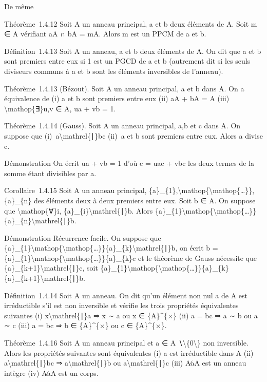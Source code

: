\documentclass[]{article}
\begin{document}
De même

Théorème~1.4.12 Soit A un anneau principal, a et b deux éléments de A.
Soit m ∈ A vérifiant aA ∩ bA = mA. Alors m est un PPCM de a et b.

Définition~1.4.13 Soit A un anneau, a et b deux éléments de A. On dit
que a et b sont premiers entre eux si 1 est un PGCD de a et b (autrement
dit si les seuls diviseurs communs à a et b sont les éléments
inversibles de l'anneau).

Théorème~1.4.13 (Bézout). Soit A un anneau principal, a et b dans A. On
a équivalence de (i) a et b sont premiers entre eux (ii) aA + bA = A
(iii) \textbackslash{}mathop\{∃\}u,v ∈ A, ua + vb = 1.

Théorème~1.4.14 (Gauss). Soit A un anneau principal, a,b et c dans A. On
suppose que (i)~a\textbackslash{}mathrel\{∣\}bc (ii)~a et b sont
premiers entre eux. Alors a divise c.

Démonstration On écrit ua + vb = 1 d'où c = uac + vbc les deux termes de
la somme étant divisibles par a.

Corollaire~1.4.15 Soit A un anneau principal,
\{a\}\_\{1\},\textbackslash{}mathop\{\textbackslash{}mathop\{\ldots{}\}\},\{a\}\_\{n\}
des éléments deux à deux premiers entre eux. Soit b ∈ A. On suppose que
\textbackslash{}mathop\{∀\}i, \{a\}\_\{i\}\textbackslash{}mathrel\{∣\}b.
Alors
\{a\}\_\{1\}\textbackslash{}mathop\{\textbackslash{}mathop\{\ldots{}\}\}\{a\}\_\{n\}\textbackslash{}mathrel\{∣\}b.

Démonstration Récurrence facile. On suppose que
\{a\}\_\{1\}\textbackslash{}mathop\{\textbackslash{}mathop\{\ldots{}\}\}\{a\}\_\{k\}\textbackslash{}mathrel\{∣\}b,
on écrit b =
\{a\}\_\{1\}\textbackslash{}mathop\{\textbackslash{}mathop\{\ldots{}\}\}\{a\}\_\{k\}c
et le théorème de Gauss nécessite que
\{a\}\_\{k+1\}\textbackslash{}mathrel\{∣\}c, soit
\{a\}\_\{1\}\textbackslash{}mathop\{\textbackslash{}mathop\{\ldots{}\}\}\{a\}\_\{k\}\{a\}\_\{k+1\}\textbackslash{}mathrel\{∣\}b.

Définition~1.4.14 Soit A un anneau. On dit qu'un élément non nul a de A
est irréductible s'il est non inversible et vérifie les trois propriétés
équivalentes suivantes (i) x\textbackslash{}mathrel\{∣\}a ⇒ x ∼ a ou x ∈
\{A\}\^{}\{×\} (ii) a = bc ⇒ a ∼ b ou a ∼ c (iii) a = bc ⇒ b ∈
\{A\}\^{}\{×\} ou c ∈ \{A\}\^{}\{×\}.

Théorème~1.4.16 Soit A un anneau principal et a ∈ A
∖\textbackslash{}\{0\textbackslash{}\} non inversible. Alors les
propriétés suivantes sont équivalentes (i) a est irréductible dans A
(ii) a\textbackslash{}mathrel\{∣\}bc ⇒ a\textbackslash{}mathrel\{∣\}b ou
a\textbackslash{}mathrel\{∣\}c (iii) A∕aA est un anneau intègre (iv)
A∕aA est un corps.
\end{document}

